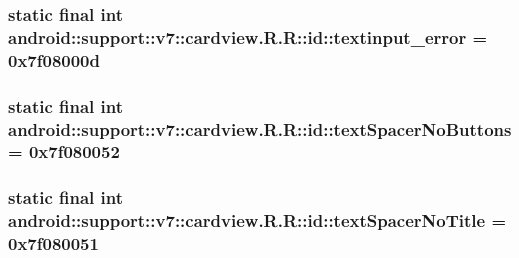 \hypertarget{classandroid_1_1support_1_1v7_1_1cardview_1_1_r_1_1id_33ceb8fed34ae02b0d9111fc46a0b0eb}{
\subsubsection[{textinput\_\-error}]{\setlength{\rightskip}{0pt plus 5cm}static final int android::support::v7::cardview.R.R::id::textinput\_\-error = 0x7f08000d}}
\label{classandroid_1_1support_1_1v7_1_1cardview_1_1_r_1_1id_33ceb8fed34ae02b0d9111fc46a0b0eb}


\hypertarget{classandroid_1_1support_1_1v7_1_1cardview_1_1_r_1_1id_710d277acb5956a80c0e424266229560}{
\subsubsection[{textSpacerNoButtons}]{\setlength{\rightskip}{0pt plus 5cm}static final int android::support::v7::cardview.R.R::id::textSpacerNoButtons = 0x7f080052}}
\label{classandroid_1_1support_1_1v7_1_1cardview_1_1_r_1_1id_710d277acb5956a80c0e424266229560}


\hypertarget{classandroid_1_1support_1_1v7_1_1cardview_1_1_r_1_1id_3964f2bbd277fa7ccd4d6e3ea1ef02f0}{
\subsubsection[{textSpacerNoTitle}]{\setlength{\rightskip}{0pt plus 5cm}static final int android::support::v7::cardview.R.R::id::textSpacerNoTitle = 0x7f080051}}
\label{classandroid_1_1support_1_1v7_1_1cardview_1_1_r_1_1id_3964f2bbd277fa7ccd4d6e3ea1ef02f0}


